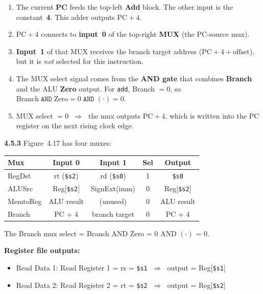 \begin{enumerate}
  \item The current \textbf{PC} feeds the top-left \textbf{Add} block.
        The other input is the constant~\textbf{4}.
        This adder outputs $\text{PC}+4$.
  \item $\text{PC}+4$ connects to \textbf{input~0} of the top-right
        \textbf{MUX} (the PC-source mux).
  \item \textbf{Input~1} of that MUX receives the branch target address
        ($\text{PC}+4+\text{offset}$), but it is \emph{not} selected
        for this instruction.
  \item The MUX select signal comes from the \textbf{AND gate} that
        combines \textbf{Branch} and the ALU \textbf{Zero} output.
        For \texttt{add}, Branch $= 0$, so
        $\text{Branch} \;\texttt{AND}\; \text{Zero}
        = 0 \;\texttt{AND}\; (\cdot) = 0$.
  \item MUX select $= 0$ $\;\Rightarrow\;$ the mux outputs
        $\text{PC}+4$, which is written into the PC register on the
        next rising clock edge.
\end{enumerate}

\medskip\noindent\textbf{4.5.3}
Figure~4.17 has four muxes:

\begin{center}
\begin{tabular}{lcccc}
\toprule
\textbf{Mux} & \textbf{Input 0} & \textbf{Input 1} & \textbf{Sel} & \textbf{Output} \\
\midrule
RegDst   & rt (\texttt{\$s2}) & rd (\texttt{\$s0}) & 1 & \texttt{\$s0} \\
ALUSrc   & Reg[\texttt{\$s2}] & SignExt(imm) & 0 & Reg[\texttt{\$s2}] \\
MemtoReg & ALU result & (unused) & 0 & ALU result \\
Branch   & PC + 4 & branch target & 0 & PC + 4 \\
\bottomrule
\end{tabular}
\end{center}

\noindent The Branch mux select = Branch AND Zero = $0$ AND $(\cdot)$ = 0.

\medskip\noindent\textbf{Register file outputs:}
\begin{itemize}
  \item Read Data 1: Read Register 1 = rs = \texttt{\$s1}
        $\;\Rightarrow\;$ output = Reg[\texttt{\$s1}]
  \item Read Data 2: Read Register 2 = rt = \texttt{\$s2}
        $\;\Rightarrow\;$ output = Reg[\texttt{\$s2}]
\end{itemize}

